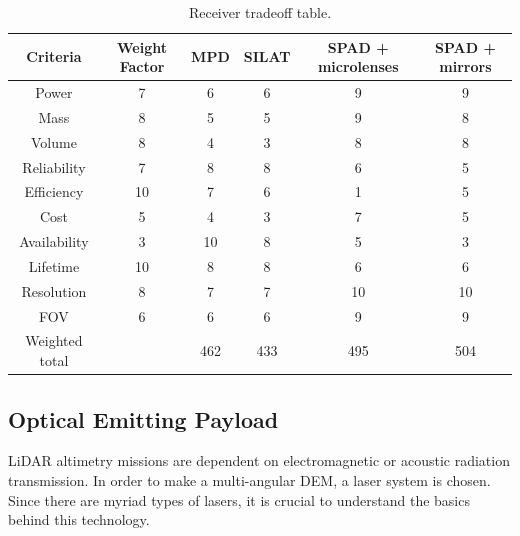 \begin{table}[h]
	\centering
		\begin{tabular}{c|c|c|c|c|c}
		 \textbf{Criteria} & \textbf{Weight Factor} & \textbf{MPD} & \textbf{SILAT} & \textbf{SPAD + microlenses} & \textbf{SPAD + mirrors} \\ \hline \hline
		 Power & 7 & 6 & 6 & 9 & 9 \\ 
		 Mass & 8 & 5 & 5 & 9 & 8 \\
		 Volume & 8 & 4 & 3 & 8 & 8 \\
		 Reliability & 7 & 8 & 8 & 6 & 5 \\
		 Efficiency & 10 & 7 & 6 & 1 & 5 \\
		 Cost & 5 & 4 & 3 & 7 & 5 \\
		 Availability & 3 & 10 & 8 & 5 & 3 \\
		 Lifetime & 10 & 8 & 8 & 6 & 6 \\
		 Resolution & 8 & 7 & 7 & 10 & 10 \\
		 FOV & 6 & 6 & 6 & 9 & 9 \\ \hline
		 Weighted total &   & 462 & 433 & 495 & 504 \\
			
		\end{tabular}
	\caption{Receiver tradeoff table.}
	\label{table:receiverTradeTable}
\end{table}

\subsection{Optical Emitting Payload}
	\label{mtDOLSR}
\acs{LiDAR} altimetry missions are dependent on electromagnetic or acoustic radiation transmission. In order to make a multi-angular \acs{DEM}, a \ac{laser} system is chosen. Since there are myriad types of \acs{laser}s, it is crucial to understand the basics behind this technology.  

